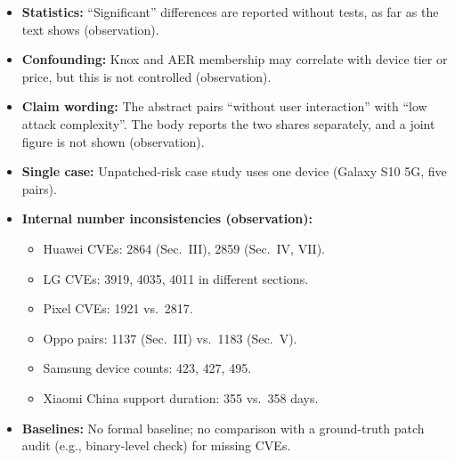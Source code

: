 \documentclass[11pt,a4paper]{article}
\begin{document}
\begin{enumerate}
\begin{itemize}[leftmargin=*,itemsep=1pt,topsep=2pt]
\begin{itemize}[itemsep=0pt]
        \end{itemize}
        \item \textbf{Statistics:} ``Significant'' differences are reported without tests, as far as the text shows (observation).
        \item \textbf{Confounding:} Knox and AER membership may correlate with device tier or price, but this is not controlled (observation).
        \item \textbf{Claim wording:} The abstract pairs ``without user interaction'' with ``low attack complexity''. The body reports the two shares separately, and a joint figure is not shown (observation).
        \item \textbf{Single case:} Unpatched-risk case study uses one device (Galaxy S10 5G, five pairs).
        \item \textbf{Internal number inconsistencies (observation):}
        \begin{itemize}[itemsep=0pt]
            \item Huawei CVEs: 2864 (Sec.~III), 2859 (Sec.~IV, VII).
            \item LG CVEs: 3919, 4035, 4011 in different sections.
            \item Pixel CVEs: 1921 vs.\ 2817.
            \item Oppo pairs: 1137 (Sec.~III) vs.\ 1183 (Sec.~V).
            \item Samsung device counts: 423, 427, 495.
            \item Xiaomi China support duration: 355 vs.\ 358 days.
        \end{itemize}
        \item \textbf{Baselines:} No formal baseline; no comparison with a ground-truth patch audit (e.g., binary-level check) for missing CVEs.
    \end{itemize}


\end{enumerate}
\end{document}
